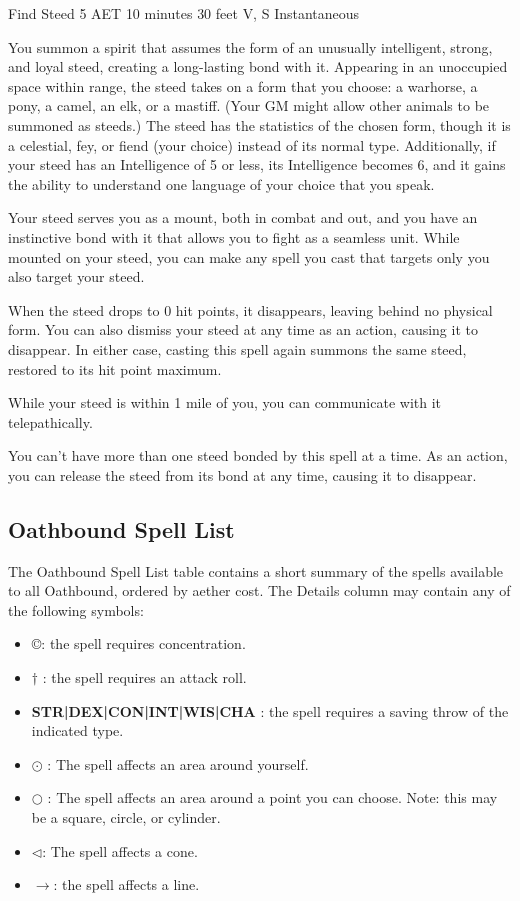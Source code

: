 \begin{DndSidebar}{Find Steed}
    \label{spell:find-steed}
{5 AET}
{10 minutes}
{30 feet}
{V, S}
{Instantaneous}

You summon a spirit that assumes the form of an unusually intelligent, strong, and loyal steed, creating a long-lasting bond with it. Appearing in an unoccupied space within range, the steed takes on a form that you choose: a warhorse, a pony, a camel, an elk, or a mastiff. (Your GM might allow other animals to be summoned as steeds.) The steed has the statistics of the chosen form, though it is a celestial, fey, or fiend (your choice) instead of its normal type. Additionally, if your steed has an Intelligence of 5 or less, its Intelligence becomes 6, and it gains the ability to understand one language of your choice that you speak.

Your steed serves you as a mount, both in combat and out, and you have an instinctive bond with it that allows you to fight as a seamless unit. While mounted on your steed, you can make any spell you cast that targets only you also target your steed.

When the steed drops to 0 hit points, it disappears, leaving behind no physical form. You can also dismiss your steed at any time as an action, causing it to disappear. In either case, casting this spell again summons the same steed, restored to its hit point maximum.

While your steed is within 1 mile of you, you can communicate with it telepathically.

You can't have more than one steed bonded by this spell at a time. As an action, you can release the steed from its bond at any time, causing it to disappear.
\end{DndSidebar}

\subsection{Oathbound Spell List}
The Oathbound Spell List table contains a short summary of the spells available to all Oathbound, ordered by aether cost. The Details column may contain any of the following symbols:
\begin{itemize}
	\item \copyright : the spell requires concentration.
	\item $\dagger$ : the spell requires an attack roll.
	\item \textbf{STR|DEX|CON|INT|WIS|CHA} : the spell requires a saving throw of the indicated type.
	\item $\odot$ : The spell affects an area around yourself.
	\item $\bigcirc$ : The spell affects an area around a point you can choose. Note: this may be a square, circle, or cylinder.
	\item $\triangleleft$: The spell affects a cone.
	\item $\rightarrow$: the spell affects a line.
\end{itemize}

